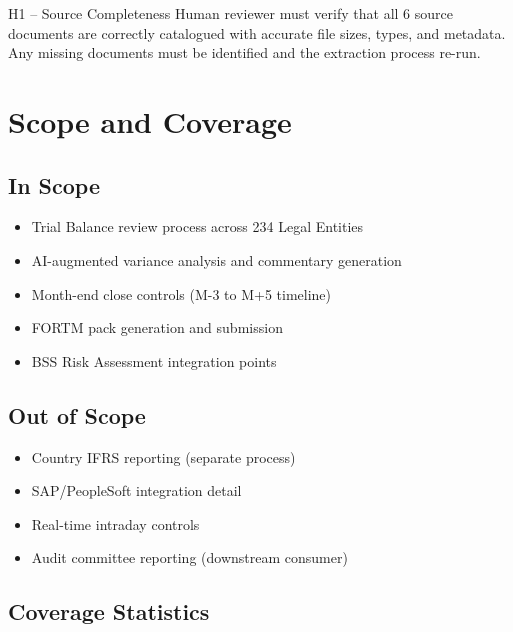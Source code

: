 \documentclass[11pt,a4paper,twoside]{report}
\begin{document}
\begin{hitlbox}{H1 -- Source Completeness}
Human reviewer must verify that all 6 source documents are correctly
catalogued with accurate file sizes, types, and metadata. Any missing
documents must be identified and the extraction process re-run.
\end{hitlbox}

\section{Scope and Coverage}
\label{sec:scope-coverage}

\subsection{In Scope}

\begin{itemize}[noitemsep]
\item Trial Balance review process across 234 Legal Entities
\item AI-augmented variance analysis and commentary generation
\item Month-end close controls (M-3 to M+5 timeline)
\item FORTM pack generation and submission
\item BSS Risk Assessment integration points
\end{itemize}

\subsection{Out of Scope}

\begin{itemize}[noitemsep]
\item Country IFRS reporting (separate process)
\item SAP/PeopleSoft integration detail
\item Real-time intraday controls
\item Audit committee reporting (downstream consumer)
\end{itemize}

\subsection{Coverage Statistics}
\end{document}
